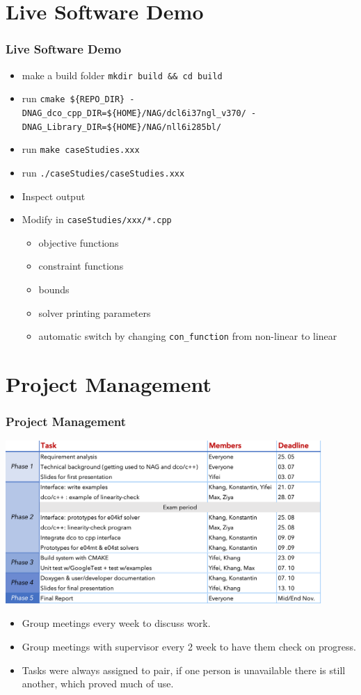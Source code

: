 \documentclass[ucs,10pt]{beamer}
\begin{document}
\section{Live Software Demo}
\begin{frame}
\frametitle{Live Software Demo} 
\begin{itemize}
	\item make a build folder \texttt{mkdir build \&\& cd build}
	\item run \texttt{cmake \$\{REPO\_DIR\} -DNAG\_dco\_cpp\_DIR=\$\{HOME\}/NAG/dcl6i37ngl\_v370/ -DNAG\_Library\_DIR=\$\{HOME\}/NAG/nll6i285bl/}
	\item run \texttt{make caseStudies.xxx}
	\item run \texttt{./caseStudies/caseStudies.xxx}
	\item Inspect output
	\item Modify in \texttt{caseStudies/xxx/*.cpp}
\begin{itemize}
	\item objective functions
	\item constraint functions
	\item bounds
	\item solver printing parameters
	\item automatic switch by changing \texttt{con\_function} from non-linear to linear
\end{itemize}
\end{itemize}
\end{frame}


\section{Project Management}

\begin{frame}
\frametitle{Project Management}
\vspace{1ex}
\includegraphics[width=0.9\textwidth]{proj_management.png}
\begin{itemize}
	\item Group meetings every week to discuss work.
	\item Group meetings with supervisor every 2 week to have them check on progress.
	\item Tasks were always assigned to pair, if one person is unavailable there is still another, which proved much of use.
\end{itemize}
\end{frame}
\end{document}
